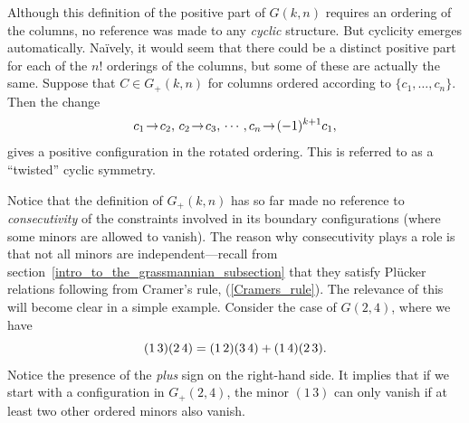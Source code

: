 \documentclass[12pt,hyperref,compress]{JHEP3}
\newcommand{\eq}[1]{\begin{equation}#1\end{equation}}
\begin{document}
{Although this definition of the positive part of $G(k,n)$ requires an ordering of the columns, no reference was made to any {\it cyclic} structure. But cyclicity emerges automatically. Na\"{i}vely, it would seem that there could be a distinct positive part for each of the $n!$ orderings of the columns, but some of these are actually the same. Suppose that $C\!\in\!G_+(k,n)$ for columns ordered according to $\{c_1,\ldots,c_n\}$. Then the change
\vspace{-.0cm}\eq{c_1\!\to\! c_2, \, c_2\!\to\!c_3,\, \cdots \, , c_n\!\to\! (-1)^{k+1} c_1,\vspace{-.0cm}}
gives a positive configuration in the rotated ordering. This is referred to as a ``twisted'' cyclic symmetry.

Notice that the definition of $G_+(k,n)$ has so far made no reference to {\it consecutivity} of the constraints involved in its boundary configurations (where some minors are allowed to vanish). The reason why consecutivity plays a role is that not all minors are independent---recall from \mbox{section \ref{intro_to_the_grassmannian_subsection}} that they satisfy Pl\"{u}cker relations following from Cramer's rule, (\ref{Cramers_rule}). The relevance of this will become clear in a simple example. Consider the case of $G(2,4)$, where we have
\vspace{-.2cm}\eq{(1\,3)(2\,4)=(1\,2)(3\,4)+(1\,4)(2\,3).\vspace{-.2cm}}
Notice the presence of the {\it plus} sign on the right-hand side. It implies that if we start with a configuration in $G_+(2,4)$, the minor $(1\,3)$ can only vanish if at least two other ordered minors also vanish.

}
\end{document}
